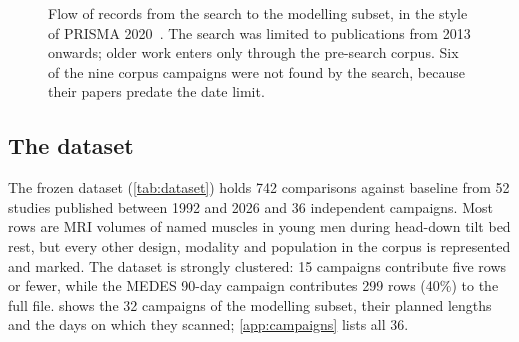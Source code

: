 \begin{figure}[htbp]
\caption[Flow of records from search to modelling subset]{Flow of records from the search to the modelling
subset, in the style of PRISMA 2020~\citep{page2021}. The search was limited to publications from 2013 onwards;
older work enters only through the pre-search corpus. Six of the nine corpus campaigns were not found by the search,
because their papers predate the date limit.}
\label{fig:prisma}
\end{figure}

\subsection{The dataset}

The frozen dataset (\cref{tab:dataset}) holds 742 comparisons against baseline from 52 studies published between
1992 and 2026 and 36 independent campaigns. Most rows are MRI volumes of named muscles in young men during
head-down tilt bed rest, but every other design, modality and population in the corpus is represented and marked.
The dataset is strongly clustered: 15 campaigns contribute five rows or fewer, while the MEDES 90-day campaign
contributes 299 rows (40\%) to the full file.  shows the 32 campaigns of the modelling subset,
their planned lengths and the days on which they scanned; \cref{app:campaigns} lists all 36.

